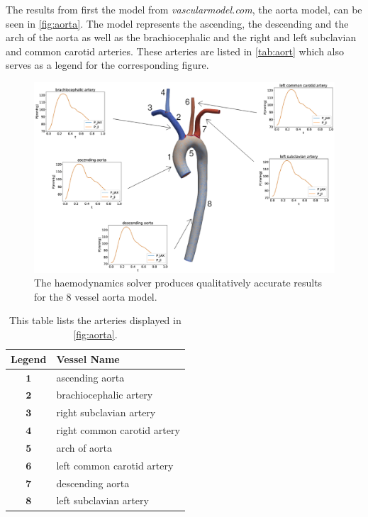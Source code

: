 \documentclass[a4paper, oneside]{discothesis}
\begin{document}
The results from first the model from \emph{vascularmodel.com}, the aorta model, can be seen in \autoref{fig:aorta}.
The model represents the ascending, the descending and the arch of the aorta as well as the brachiocephalic and the right and left subclavian and common carotid arteries.
These arteries are listed in \autoref{tab:aort} which also serves as a legend for the corresponding figure.

\begin{figure} [!ht]
	\centering
	\includegraphics[width=0.8\columnwidth]{figures/0007.eps}
	\caption{The haemodynamics solver produces qualitatively accurate results for the 8 vessel aorta model.}
	\label{fig:aorta}
\end{figure}

\begin{table}[!ht] 
	\begin{center}
		\begin{tabular}{|c|l|} 
			\hline
			Legend & Vessel Name\\
			\hline
			$\mathbf{1}$& ascending aorta \\ 
			$\mathbf{2}$& brachiocephalic artery \\
			$\mathbf{3}$& right subclavian artery \\
			$\mathbf{4}$& right common carotid artery \\
			$\mathbf{5}$& arch of aorta \\
			$\mathbf{6}$& left common carotid artery \\
			$\mathbf{7}$& descending aorta \\
			$\mathbf{8}$& left subclavian artery \\
			\hline
		\end{tabular}
	\end{center}
	\caption{This table lists the arteries displayed in \autoref{fig:aorta}.}
	\label{tab:aort}
\end{table}
\end{document}
